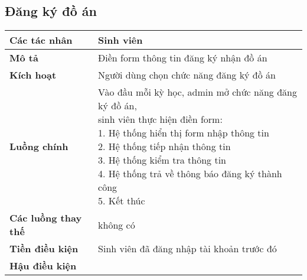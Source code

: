 	\subsection*{Đăng ký đồ án}
	\begin{tabular}{|l|p{}|}
		\hline
		\textbf{Các tác nhân}         & Sinh viên                                                                                         \\
		\hline
		\textbf{Mô tả}                & Điền form thông tin đăng ký nhận đồ án                                                            \\
		\hline
		\textbf{Kích hoạt}            & Người dùng chọn chức năng đăng ký đồ án                                                           \\
		\hline
		\textbf{Luồng chính}           & \makecell[l]{Vào đầu mỗi kỳ học, admin mở chức năng đăng ký đồ án, \\sinh viên thực hiện điền form: \\ 1. Hệ thống hiển thị form nhập thông tin \\ 2. Hệ thống tiếp nhận thông tin \\ 3. Hệ thống kiểm tra thông tin \\ 4. Hệ thống trả về thông báo đăng ký thành công \\ 5. Kết thúc} \\
		\hline
		\textbf{Các luồng thay thế}   & không có                                                                                          \\
		\hline
		\textbf{Tiền điều kiện}       & Sinh viên đã đăng nhập tài khoản trước đó                                                         \\
		\hline
		\textbf{Hậu điều kiện}        &                                                                                                   \\
		\hline
	\end{tabular}


